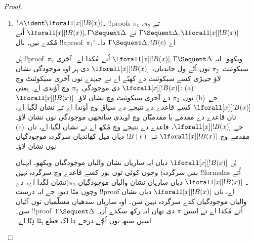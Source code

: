 \documentclass[../../../include/open-logic-section]{subfiles}
\begin{document}
\begin{proof}
\begin{enumerate}
\[
  \AxiomC{}
  \RightLabel{$\pi_2'$}
  \Deduce$\Gamma \fCenter \Delta, !B$
  \AxiomC{}
  \RightLabel{$\pi_1'$}
  \Deduce$!B, \Gamma \fCenter \Delta, !C$
  \AxiomC{}
  \RightLabel{$\pi_2'''$}
  \Deduce$!C, !B, \Gamma \fCenter \Delta$
  \RightLabel{\CutCS}
  \BinaryInf$!B, \Gamma \fCenter \Delta$
  \RightLabel{\CutCS}
  \BinaryInf$\Gamma \fCenter \Delta$
  \DisplayProof
  \]
\item $!A \ident \lforall[x][!B(x)]$۔ !!{proof}s $\pi_1$ تے
$\pi_2$، $\Gamma \Sequent \Delta, \lforall[x][!B(x)]$ تے
$\lforall[x][!B(x)], \Gamma \Sequent \Delta$ اُتے مُکدے نیں۔
 نال !!a{proof}~$\pi_1'$ اے $\Gamma
\Sequent \Delta, !B(c)$ دا۔

ہُن !!{proof}~$\pi_2$ ویکھو۔ ایہ $\lforall[x][!B(x)],
  \Gamma \Sequent \Delta$ اُتے مُکدا اے۔ آخری سیکوئنٹ~$\pi_2$ توں اُتّے ول جاندیاں، $\lforall[x][!B(x)]$ دی ہر اوہ موجودگی نشان لاؤ جیہڑی کسے سیکوئنٹ دے کھبّے اے تے جیہدے توں آخری سیکوئنٹ وچ $\lforall[x][!B(x)]$ دی موجودگی~$\pi_2$ وچ آؤندی اے۔ یعنی:
(a)~$\lforall[x][!B(x)]$ نوں~$\pi_2$ دے آخری سیکوئنٹ وچ نشان لاؤ۔ (b)~جے
$\lforall[x][!B(x)]$ کسے قاعدے دے نتیجے دے سیاق وچ آؤندا اے تے نشان لگیا اے، تاں قاعدے دے مقدمے یا مقدمیّاں وچ اوہدی سانجھی موجودگی نوں نشان لاؤ۔ (c)~جے $\lforall[x][!B(x)]$، \LeftR{\lforall} قاعدے دے نتیجے وچ مُکھ اے تے نشان لگیا اے، تاں مقدمے وچ $\lforall[x][!B(x)]$ تے $!B(t)$ دیاں میل کھاندیاں سرگردہ موجودگیاں نوں نشان لاؤ۔

ہُن $\lforall[x][!B(x)]$ دیاں ایہ ساریاں نشان والیاں موجودگیاں ویکھو۔ ایہناں وچوں کوئی \LeftR{\lforall} توں ہور کسے قاعدے وچ سرگردہ نہیں (بس سرگردہ !!{formula}s اُتے نشان لگدا اے، \LeftR{\lforall} دے)۔ $\lforall[x][!B(x)]$ دیاں ساریاں نشان والیاں موجودگیاں $\pi_2$ وچوں مٹا دیو۔ جے ایہ درست !!{proof} اے، تاں $\lforall[x][!B(x)]$ دیاں نشان والیاں موجودگیاں کدے سرگردہ نہیں سن۔ اوہ ساریاں سدھیاں مسلّمیاں توں آئیاں سن۔ !!{proof}~$\Gamma \Sequent \Delta$ اُتے مُکدا اے تے اسیں $\pi$ دی تھاں ایہ رکھ سکدے آں۔ اسیں سبھ توں اُچّے درجے دا اک قطع ہٹا دِتّا اے۔


\end{enumerate}
\end{proof}
\end{document}
